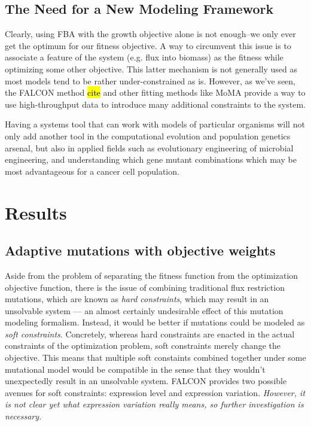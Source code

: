 \subsection{The Need for a New Modeling Framework}
Clearly, using FBA with the growth objective alone is not enough--we
only ever get the optimum for our fitness objective.  A way to
circumvent this issue is to associate a feature of the system
(e.g. flux into biomass) as the fitness while optimizing some other
objective. This latter mechanism is not generally used as most models
tend to be rather under-constrained as is. However, as we've seen, the
FALCON method \hl{cite} and other fitting methods like MoMA provide a
way to use high-throughput data to introduce many additional
constraints to the system.

Having a systems tool that can work with models of particular organisms
will not only add another tool in the computational evolution and
population genetics arsenal, but also in applied fields such as
evolutionary engineering of microbial engineering, and understanding
which gene mutant combinations which may be most advantageous for
a cancer cell population.

\section{Results}

\subsection{Adaptive mutations with objective weights}

Aside from the problem of separating the fitness function from the 
optimization objective function, there is the issue of combining traditional flux
restriction mutations, which are known as \emph{hard constraints}, which may
result in an unsolvable system --- an almost certainly undesirable
effect of this mutation modeling formalism. Instead, it would be
better if mutations could be modeled as \emph{soft
  constraints}. Concretely, whereas hard constraints are enacted in
the actual constraints of the optimization problem, soft constraints
merely change the objective. This means that multiple soft constaints
combined together under some mutational model would be compatible in
the sense that they wouldn't unexpectedly result in an unsolvable
system. FALCON provides two possible avenues for soft constraints:
expression level and expression variation. \emph{However, it is not
  clear yet what expression variation really means, so further
  investigation is necessary.}


